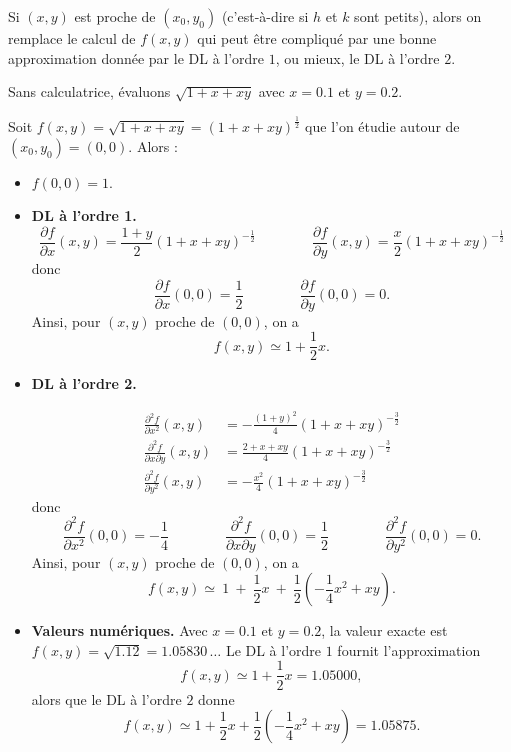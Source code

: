 \documentclass[11pt, class=report,crop=false]{standalone}
\begin{document}
Si $(x,y)$ est proche de $(x_0,y_0)$ (c'est-à-dire si $h$ et $k$ sont petits), alors on remplace le calcul de $f(x,y)$ qui peut être compliqué par une bonne approximation donnée par le DL à l'ordre $1$, ou mieux, le DL à l'ordre $2$.

\begin{exemple}
Sans calculatrice, évaluons $\sqrt{1+x+xy}$ avec $x=0.1$ et $y=0.2$.

Soit $f(x,y) = \sqrt{1+x+xy} = (1+x+xy)^{\frac12}$ que l'on étudie autour de $(x_0,y_0)=(0,0)$.
Alors :
\begin{itemize}
    \item $f(0,0) = 1$.
    
    \item \textbf{DL à l'ordre 1.}
    $$\frac{\partial f}{\partial x}(x,y) = \frac{1+y}{2}(1+x+xy)^{-\frac12}
    \qquad\qquad
    \frac{\partial f}{\partial y}(x,y) = \frac{x}{2}(1+x+xy)^{-\frac12}$$
    donc
    $$\frac{\partial f}{\partial x}(0,0) = \frac12
    \qquad\qquad
    \frac{\partial f}{\partial y}(0,0) = 0.$$
    Ainsi, pour $(x,y)$ proche de $(0,0)$, on a  
    $$f(x,y) \simeq 1+\frac12x.$$ 
      
    \item \textbf{DL à l'ordre 2.} 
    
    \begin{align*}
    \frac{\partial^2f}{\partial x^2}(x,y) &=  -\frac{(1+y)^2}{4}(1+x+xy)^{-\frac32}\\
    \frac{\partial^2f}{\partial x\partial y}(x,y) &= \frac{2+x+xy}{4}(1+x+xy)^{-\frac32}\\
    \frac{\partial^2f}{\partial y^2}(x,y) &= -\frac{x^2}{4}(1+x+xy)^{-\frac32}
    \end{align*}
    donc 
    $$\frac{\partial^2f}{\partial x^2}(0,0) = -\frac14\qquad \qquad
    \frac{\partial^2f}{\partial x\partial y}(0,0) = \frac12 \qquad\qquad
    \frac{\partial^2f}{\partial y^2}(0,0) = 0.$$ 
    Ainsi, pour $(x,y)$ proche de $(0,0)$, on a 
    $$   
    f(x,y) 
    \simeq \ 1 \  + \  \frac12x
    \  +\ 
    \frac12\left(-\frac14x^2+ xy\right).
    $$
    
      
\item \textbf{Valeurs numériques.}
    Avec $x=0.1$ et $y=0.2$, la valeur exacte est $f(x,y) = \sqrt{1.12} = 1.05830\,\ldots$
    Le DL à l'ordre $1$ fournit l'approximation 
    $$f(x,y) \simeq 1+\frac12x = 1.05000,$$    
    alors que le DL à l'ordre $2$ donne
    $$f(x,y) \simeq 1 + \frac12x + \frac12\left(-\frac14x^2+ xy\right) = 1.05875.$$   
    
\end{itemize}  
       
\end{exemple}   
  
\end{document}
